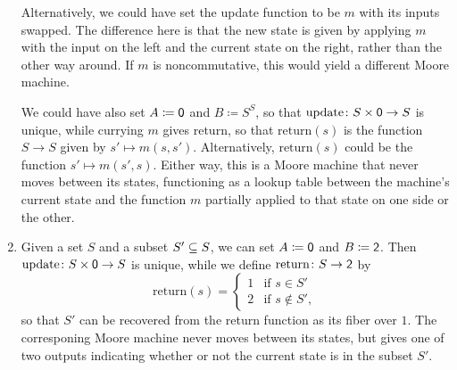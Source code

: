 \documentclass[Book-Poly]{subfiles}
\begin{document}
\begin{exercise}
\begin{solution}
\begin{enumerate}
    Alternatively, we could have set the update function to be $m$ with its inputs swapped.
    The difference here is that the new state is given by applying $m$ with the input on the left and the current state on the right, rather than the other way around.
    If $m$ is noncommutative, this would yield a different Moore machine.

    We could have also set $A \coloneqq \0$ and $B \coloneqq S^S$, so that $\text{update} \colon S \times \0 \to S$ is unique, while currying $m$ gives $\text{return}$, so that $\text{return}(s)$ is the function $S \to S$ given by $s' \mapsto m(s, s')$.
    Alternatively, $\text{return}(s)$ could be the function $s' \mapsto m(s', s)$.
    Either way, this is a Moore machine that never moves between its states, functioning as a lookup table between the machine's current state and the function $m$ partially applied to that state on one side or the other.

    \item Given a set $S$ and a subset $S' \ss S$, we can set $A \coloneqq \0$ and $B \coloneqq \2$.
    Then $\text{update} \colon S \times \0 \to S$ is unique, while we define $\text{return} \colon S \to \2$ by
    \[
        \text{return}(s) =
        \begin{cases}
            1 & \text{if } s \in S' \\
            2 & \text{if } s \notin S',
        \end{cases}
    \]
    so that $S'$ can be recovered from the return function as its fiber over $1$.
    The corresponing Moore machine never moves between its states, but gives one of two outputs indicating whether or not the current state is in the subset $S'$.
\end{enumerate}
\end{solution}
\end{exercise}
\end{document}
